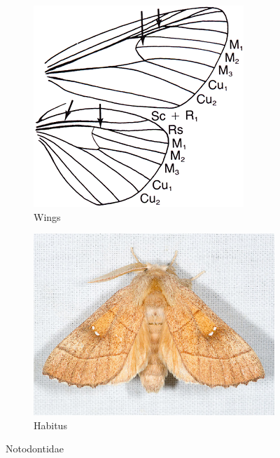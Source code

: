 \documentclass[letterpaper, 11pt]{article}
\begin{document}
\begin{figure}[ht!]
    \centering
    \begin{subfigure}[ht!]{0.32\textwidth}
        \includegraphics[width=\textwidth]{image17}
        \caption{Wings}
        \label{fig:notodontid1}
    \end{subfigure}
    \qquad %
    \begin{subfigure}[ht!]{0.44\textwidth}
        \includegraphics[width=\textwidth]{image16}
        \caption{Habitus}
        \label{fig:notodontid2}
    \end{subfigure}
    \caption{Notodontidae}\label{fig:notodontids}
\end{figure}
\end{document}
